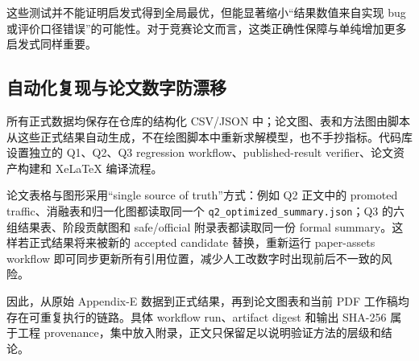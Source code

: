 这些测试并不能证明启发式得到全局最优，但能显著缩小“结果数值来自实现 bug 或评价口径错误”的可能性。对于竞赛论文而言，这类正确性保障与单纯增加更多启发式同样重要。

\subsection{自动化复现与论文数字防漂移}

所有正式数据均保存在仓库的结构化 CSV/JSON 中；论文图、表和方法图由脚本从这些正式结果自动生成，不在绘图脚本中重新求解模型，也不手抄指标。代码库设置独立的 Q1、Q2、Q3 regression workflow、published-result verifier、论文资产构建和 XeLaTeX 编译流程。

论文表格与图形采用“single source of truth”方式：例如 Q2 正文中的 promoted traffic、消融表和归一化图都读取同一个 \texttt{q2\_optimized\_summary.json}；Q3 的六组结果表、阶段贡献图和 safe/official 附录表都读取同一份 formal summary。这样若正式结果将来被新的 accepted candidate 替换，重新运行 paper-assets workflow 即可同步更新所有引用位置，减少人工改数字时出现前后不一致的风险。

因此，从原始 Appendix-E 数据到正式结果，再到论文图表和当前 PDF 工作稿均存在可重复执行的链路。具体 workflow run、artifact digest 和输出 SHA-256 属于工程 provenance，集中放入附录，正文只保留足以说明验证方法的层级和结论。
